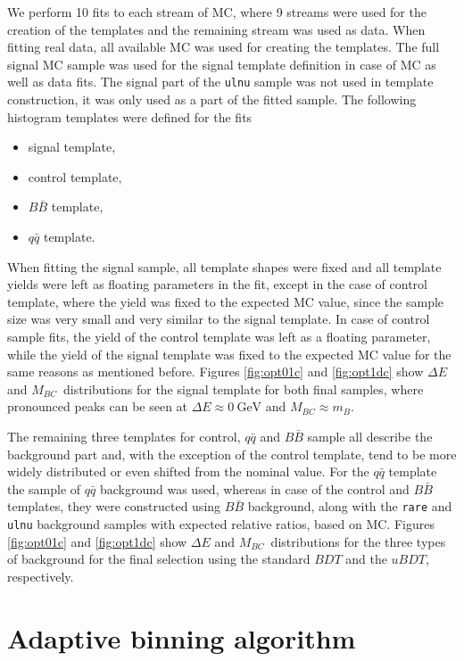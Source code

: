\documentclass[headings=standardclasses,headings=big,oneside,a4paper,openany,12pt]{scrbook}
\newcommand {\e}[1]{\mathrm{~#1}}
\newcommand {\vars}{$\Delta E$ and $M_{BC}$}
\begin{document}
We perform 10 fits to each stream of MC, where 9 streams were used for the creation of the templates and the remaining stream was used as data. When fitting real data, all available MC was used for creating the templates. The full signal MC sample was used for the signal template definition in case of MC as well as data fits. The signal part of the \texttt{ulnu} sample was not used in template construction, it was only used as a part of the fitted sample. The following histogram templates were defined for the fits
\begin{itemize}
\item signal template,
\item control template,
\item $B \bar B$ template,
\item $q \bar q$ template.
\end{itemize}

When fitting the signal sample, all template shapes were fixed and all template yields were left as floating parameters in the fit, except in the case of control template, where the yield was fixed to the expected MC value, since the sample size was very small and very similar to the signal template. In case of control sample fits, the yield of the control template was left as a floating parameter, while the yield of the signal template was fixed to the expected MC value for the same reasons as mentioned before. Figures \ref{fig:opt01c} and \ref{fig:opt1dc} show \vars~distributions for the signal template for both final samples, where pronounced peaks can be seen at $\Delta E \approx 0\e{GeV}$ and $M_{BC} \approx m_B$.

The remaining three templates for control, $q \bar q$ and $B \bar B$ sample all describe the background part and, with the exception of the control template, tend to be more widely distributed or even shifted from the nominal value. For the $q \bar q$ template the sample of $q \bar q$ background was used, whereas in case of the control and $B \bar B$ templates, they were constructed using $B \bar B$ background, along with the \texttt{rare} and \texttt{ulnu} background samples with expected relative ratios, based on MC. Figures \ref{fig:opt01c} and \ref{fig:opt1dc} show \vars~distributions for the three types of background for the final selection using the standard $BDT$ and the $uBDT$, respectively.

\section{Adaptive binning algorithm}\label{sec:adaptive-binning-algorithm}
\end{document}
